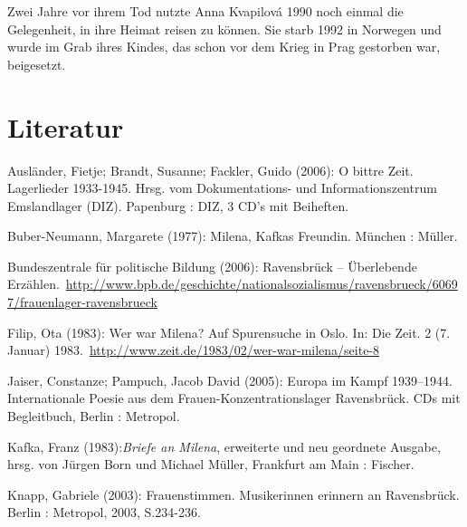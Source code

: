 \documentclass[a4paper,
fontsize=11pt,
oneside,
numbers=noperiodatend,
parskip=half-,
bibliography=totoc,
final
]{scrartcl}
\begin{document}
Zwei Jahre vor ihrem Tod nutzte Anna Kvapilová 1990 noch einmal die
Gelegenheit, in ihre Heimat reisen zu können. Sie starb 1992 in Norwegen
und wurde im Grab ihres Kindes, das schon vor dem Krieg in Prag
gestorben war, beigesetzt.

\section*{Literatur}\label{literatur}

Ausländer, Fietje; Brandt, Susanne; Fackler, Guido (2006): O bittre
Zeit. Lagerlieder 1933-1945. Hrsg. vom Dokumentations- und
Informationszentrum Emslandlager (DIZ). Papenburg : DIZ, 3 CD's mit
Beiheften.

Buber-Neumann, Margarete (1977): Milena, Kafkas Freundin. München :
Müller.

Bundeszentrale für politische Bildung (2006): Ravensbrück -- Überlebende
Erzählen.~\url{http://www.bpb.de/geschichte/nationalsozialismus/ravensbrueck/60697/frauenlager-ravensbrueck}

Filip, Ota (1983): Wer war Milena? Auf Spurensuche in Oslo. In: Die
Zeit. 2 (7. Januar)
1983.~\url{http://www.zeit.de/1983/02/wer-war-milena/seite-8}

Jaiser, Constanze; Pampuch, Jacob David (2005): Europa im Kampf
1939--1944. Internationale Poesie aus dem Frauen-Konzentrationslager
Ravensbrück. CDs mit Begleitbuch, Berlin : Metropol.

Kafka, Franz (1983):\emph{Briefe an Milena}, erweiterte und neu
geordnete Ausgabe, hrsg. von Jürgen Born und Michael Müller, Frankfurt
am Main : Fischer.

Knapp, Gabriele (2003): Frauenstimmen. Musikerinnen erinnern an
Ravensbrück. Berlin : Metropol, 2003, S.234-236.

\end{document}

